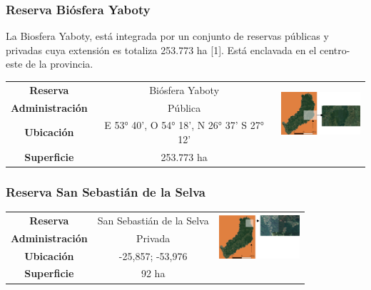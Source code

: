 \subsubsection{Reserva Biósfera Yaboty}
La Biosfera Yaboty, está integrada por un conjunto de reservas públicas y privadas cuya extensión es totaliza 253.773 ha [1]. Está enclavada en el centro-este de la provincia.
\begin{table}[H]
    \centering
    \begin{tabular}{|c|c|c|}
        \hline
        \textbf{Reserva} & Biósfera Yaboty &   \multirow{ 3}{*}{\includegraphics[width=30mm]{Imagenes/Yaboty.png}}\\ 
        \textbf{Administración} & Pública\\
        \textbf{Ubicación} & E 53° 40’, O 54° 18’, N 26° 37’ S 27° 12’ \\
        \textbf{Superficie} & 253.773 ha\\
        \hline
    \end{tabular}
    \label{Yaboty}
\end{table}

\subsubsection{Reserva San Sebastián de la Selva}
\begin{table}[H]
\centering
\begin{tabular}{|c|c|c|}
\hline
 \textbf{Reserva} & San Sebastián de la Selva &   \multirow{ 3}{*}{\includegraphics[width=30mm]{Imagenes/San Sebastian.png}}\\ 
\textbf{Administración} & Privada\\
        
        \textbf{Ubicación} & -25,857; -53,976 \\
         
        \textbf{Superficie} & 92 ha\\
\hline        
\end{tabular}

\label{San Sebastian}
\end{table}

